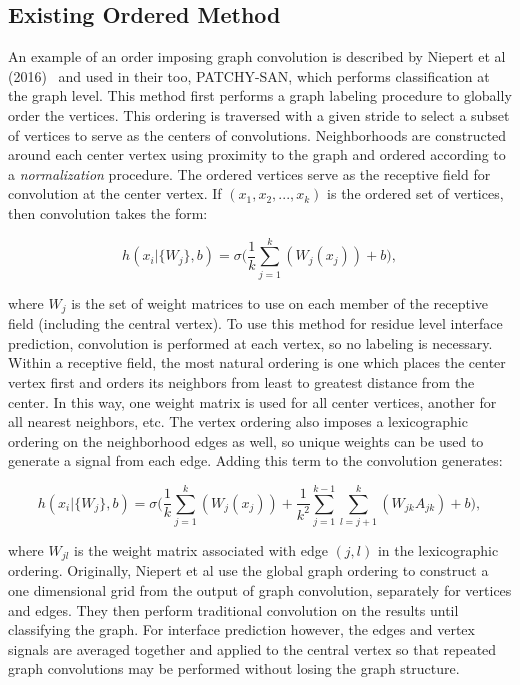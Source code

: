 \subsection{Existing Ordered Method}

An example of an order imposing graph convolution is described by Niepert et al (2016)~\cite{niepert2016} and used in their too, PATCHY-SAN, which performs classification at the graph level.
This method first performs a graph labeling procedure to globally order the vertices.
This ordering is traversed with a given stride to select a subset of vertices to serve as the centers of convolutions.
Neighborhoods are constructed around each center vertex using proximity to the graph and ordered according to a \emph{normalization} procedure.
The ordered vertices serve as the receptive field for convolution at the center vertex.
If $(x_1, x_2, ... , x_k)$ is the ordered set of vertices, then convolution takes the form:

\begin{equation}
h(x_i | \{ W_{j} \}, b)= \sigma \bigg( \frac{1}{k} \sum_{j=1}^{k}(W_{j} (x_j)) + b \bigg),
\label{eq:patchysan}
\end{equation}

\noindent
where ${W_j}$ is the set of weight matrices to use on each member of the receptive field (including the central vertex).
To use this method for residue level interface prediction, convolution is performed at each vertex, so no labeling is necessary. 
Within a receptive field, the most natural ordering is one which places the center vertex first and orders its neighbors from least to greatest distance from the center. 
In this way, one weight matrix is used for all center vertices, another for all nearest neighbors, etc.
The vertex ordering also imposes a lexicographic ordering on the neighborhood edges as well, so unique weights can be used to generate a signal from each edge. 
Adding this term to the convolution generates:

\begin{equation}
h(x_i | \{ W_{j} \}, b)= \sigma \bigg( \frac{1}{k} \sum_{j=1}^{k}(W_{j} (x_j)) + \frac{1}{k^2} \sum_{j = 1}^{k-1} \sum_{l=j+1}^{k}(W_{jk} A_{jk})  + b \bigg),
\label{eq:patchysan_2e}
\end{equation}

\noindent
where $W_{jl}$ is the weight matrix associated with edge $(j, l)$ in the lexicographic ordering.
Originally, Niepert et al use the global graph ordering to construct a one dimensional grid from the output of graph convolution, separately for vertices and edges.
They then perform traditional convolution on the results until classifying the graph. 
For interface prediction however, the edges and vertex signals are averaged together and applied to the central vertex so that repeated graph convolutions may be performed without losing the graph structure.


